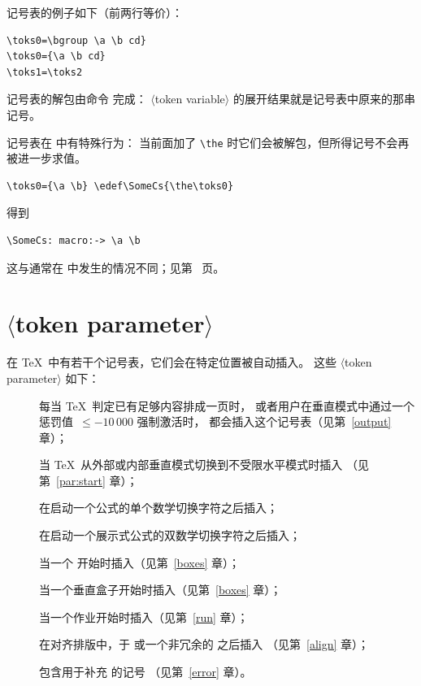 \documentclass[a4paper]{rapport3}
\def\gr#1{$\langle$#1$\rangle$}\def\key#1{{\tt#1}}
\begin{document}
记号表的例子如下（前两行等价）：
\begin{verbatim}
\toks0=\bgroup \a \b cd}
\toks0={\a \b cd}
\toks1=\toks2
\end{verbatim}

记号表的解包由命令  完成：
\gr{token variable} 的展开结果就是记号表中原来的那串记号。

记号表在  中有特殊行为：
当前面加了 \verb|\the| 时它们会被解包，但所得记号不会再被进一步求值。
\begin{verbatim}
\toks0={\a \b} \edef\SomeCs{\the\toks0}
\end{verbatim}
得到
\begin{verbatim}
\SomeCs: macro:-> \a \b
\end{verbatim}
这与通常在  中发生的情况不同；见第~\pageref{expand:edef} 页。


\section{\gr{token parameter}}

在 \TeX\ 中有若干个记号表，它们会在特定位置被自动插入。
这些 \gr{token parameter} 如下：
\begin{description} \item []
   每当 \TeX\ 判定已有足够内容排成一页时，
   或者用户在垂直模式中通过一个惩罚值~$\leq-10\,000$ 强制激活时，
   都会插入这个记号表（见第~\ref{output} 章）；
\item []
   当 \TeX\ 从外部或内部垂直模式切换到不受限水平模式时插入
   （见第~\ref{par:start} 章）；
\item []
   在启动一个公式的单个数学切换字符之后插入；
\item []
   在启动一个展示式公式的双数学切换字符之后插入；
\item []
   当一个  开始时插入（见第~\ref{boxes} 章）；
\item []
   当一个垂直盒子开始时插入（见第~\ref{boxes} 章）；
\item []
   当一个作业开始时插入（见第~\ref{run} 章）；
\item []
   在对齐排版中，于  或一个非冗余的  之后插入
   （见第~\ref{align} 章）；
\item []
   包含用于补充  的记号
   （见第~\ref{error} 章）。
\end{description}
\end{document}
